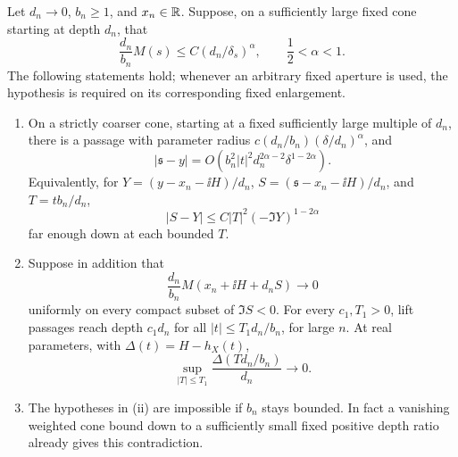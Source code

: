\begin{corollary}\label{cor:quiet-cone}
Let \(d_n\to0\), \(b_n\ge1\), and \(x_n\in\mathbb R\). Suppose, on a
sufficiently large fixed cone starting at depth \(d_n\), that
\begin{equation}\label{cone:coarse-bound}
 \frac{d_n}{b_n}M(s)\le C(d_n/\delta_s)^\alpha,
 \qquad \frac12<\alpha<1.
\end{equation}
The following statements hold; whenever an arbitrary fixed aperture is
used, the hypothesis is required on its corresponding fixed
enlargement.
\begin{enumerate}[label=\textup{(\roman*)}]
\item On a strictly coarser cone, starting at a fixed sufficiently large
multiple of \(d_n\), there is a passage with parameter radius
\(c(d_n/b_n)(\delta/d_n)^\alpha\), and
\begin{equation}\label{cone:coarse-error}
 |\mathfrak s-y|
 =O\left(b_n^2|t|^2d_n^{2\alpha-2}\delta^{1-2\alpha}\right).
\end{equation}
Equivalently, for
\(Y=(y-x_n-\ii H)/d_n\),
\(S=(\mathfrak s-x_n-\ii H)/d_n\), and \(T=tb_n/d_n\),
\[
 |S-Y|\le C|T|^2(-\Im Y)^{1-2\alpha}
\]
far enough down at each bounded \(T\).
\item Suppose in addition that
\begin{equation}\label{cone:quiet-profile}
 \frac{d_n}{b_n}M(x_n+\ii H+d_n S)\longrightarrow0
\end{equation}
uniformly on every compact subset of \(\Im S<0\).
For every \(c_1,T_1>0\), lift passages reach depth \(c_1d_n\) for all
\(|t|\le T_1d_n/b_n\), for large \(n\). At real parameters, with
\(\Delta(t)=H-h_X(t)\),
\begin{equation}\label{cone:quiet-width}
 \sup_{|T|\le T_1}\frac{\Delta(Td_n/b_n)}{d_n}\longrightarrow0.
\end{equation}
\item The hypotheses in \textup{(ii)} are impossible if \(b_n\) stays
bounded. In fact a vanishing weighted cone bound down to a sufficiently
small fixed positive depth ratio already gives this contradiction.
\end{enumerate}
\end{corollary}

